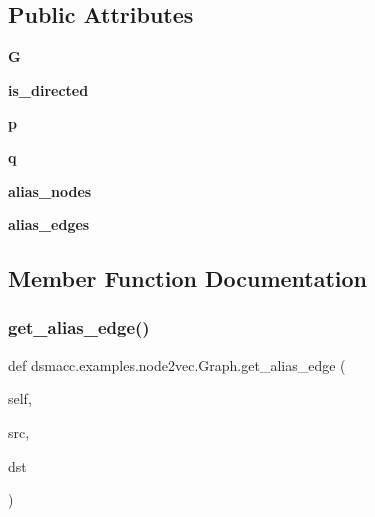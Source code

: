 \subsection*{Public Attributes}
\begin{DoxyCompactItemize}
\item 
\mbox{\label{classdsmacc_1_1examples_1_1node2vec_1_1Graph_a01ec9a78c2e80e6df67c2c767d51a5a2}} 
{\bfseries G}
\item 
\mbox{\label{classdsmacc_1_1examples_1_1node2vec_1_1Graph_ad94fa520788235af2066a10c8049c11d}} 
{\bfseries is\+\_\+directed}
\item 
\mbox{\label{classdsmacc_1_1examples_1_1node2vec_1_1Graph_a4ed1f039275b92676df6db17af19b6df}} 
{\bfseries p}
\item 
\mbox{\label{classdsmacc_1_1examples_1_1node2vec_1_1Graph_a6b13e8bbbcb028cbc00b360bbac67a00}} 
{\bfseries q}
\item 
\mbox{\label{classdsmacc_1_1examples_1_1node2vec_1_1Graph_aff47a19ec69b4ba1dcfb879047be824b}} 
{\bfseries alias\+\_\+nodes}
\item 
\mbox{\label{classdsmacc_1_1examples_1_1node2vec_1_1Graph_abab42ea179875d03bee180ca874a0d43}} 
{\bfseries alias\+\_\+edges}
\end{DoxyCompactItemize}


\subsection{Member Function Documentation}
\mbox{\label{classdsmacc_1_1examples_1_1node2vec_1_1Graph_a487b5cdcbd1260ec84f0c56b49548dff}} 
\subsubsection{\texorpdfstring{get\+\_\+alias\+\_\+edge()}{get\_alias\_edge()}}
{\footnotesize\ttfamily def dsmacc.\+examples.\+node2vec.\+Graph.\+get\+\_\+alias\+\_\+edge (\begin{DoxyParamCaption}\item[{}]{self,  }\item[{}]{src,  }\item[{}]{dst }\end{DoxyParamCaption})}

